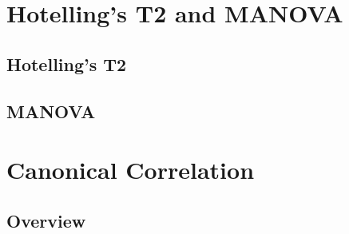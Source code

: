 \newpage
\section{Hotelling's T2 and MANOVA}
\label{MANOVA}


\subsection{Hotelling's T2}


\lipsum[2]


\subsection{MANOVA}


\lipsum[2]
%
%
%
%
%
%
%
%
%




\newpage
\section{Canonical Correlation}
\label{CanonicalCorrelation}


\subsection{Overview}
\label{CanonicalCorrelationOverview}

